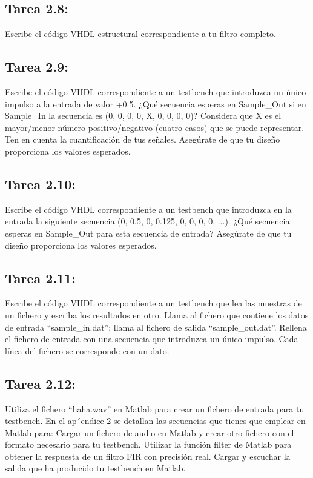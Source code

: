 \documentclass{article}
\begin{document}
\subsection{Tarea 2.8:}

Escribe el código VHDL estructural correspondiente a tu filtro completo.

\subsection{Tarea 2.9:}

Escribe el código VHDL correspondiente a un testbench que introduzca un único impulso a la entrada de valor +0.5. ¿Qué secuencia esperas en Sample{\_}Out si en Sample{\_}In la secuencia es (0, 0, 0, 0, X, 0, 0, 0, 0)? Considera que X es el mayor/menor número positivo/negativo (cuatro casos) que se puede representar. Ten en cuenta la cuantificación
de tus señales. Asegúrate de que tu diseño proporciona los valores esperados.

\subsection{Tarea 2.10:}

Escribe el código VHDL correspondiente a un testbench que introduzca en la entrada
la siguiente secuencia (0, 0.5, 0, 0.125, 0, 0, 0, 0, ...). ¿Qué secuencia esperas en Sample{\_}Out para esta secuencia de entrada? Asegúrate de que tu diseño proporciona los valores esperados.

\subsection{Tarea 2.11:}
Escribe el código VHDL correspondiente a un testbench que lea las muestras de un fichero y escriba los resultados en otro.
Llama al fichero que contiene los datos de entrada “sample{\_}in.dat”; llama al fichero de salida “sample{\_}out.dat”.
Rellena el fichero de entrada con una secuencia que introduzca un único impulso.
Cada línea del fichero se corresponde con un dato.

\subsection{Tarea 2.12:}

Utiliza el fichero “haha.wav” en Matlab para crear un fichero de entrada para tu testbench. En el ap´endice 2 se detallan las secuencias que tienes que emplear en Matlab para:
Cargar un fichero de audio en Matlab y crear otro fichero con el formato necesario para tu testbench.
Utilizar la función filter de Matlab para obtener la respuesta de un filtro FIR con precisión real.
Cargar y escuchar la salida que ha producido tu testbench en Matlab.
\end{document}

